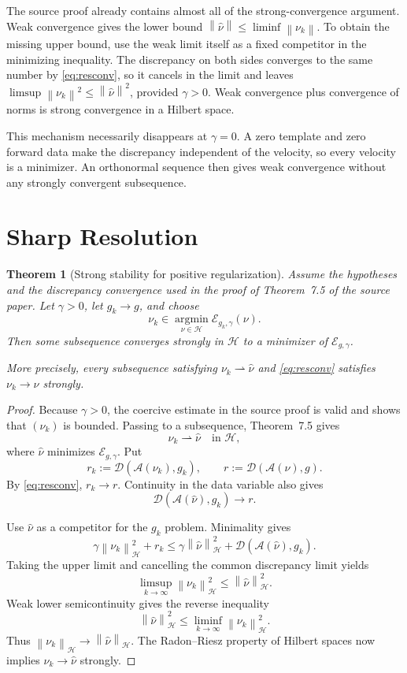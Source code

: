 \documentclass[11pt]{article}
\newtheorem{theorem}{Theorem}
\newcommand{\Hspace}{\mathcal H}
\newcommand{\Amap}{\mathcal A}
\newcommand{\Ddisc}{\mathcal D}
\newcommand{\Jfun}{\mathcal E}
\newcommand{\norm}[1]{\left\lVert#1\right\rVert}
\begin{document}
The source proof already contains almost all of the strong-convergence
argument.  Weak convergence gives the lower bound
$\norm{\widehat\nu}\leq\liminf\norm{\nu_k}$.  To obtain the missing upper
bound, use the weak limit itself as a fixed competitor in the minimizing
inequality.  The discrepancy on both sides converges to the same number by
\eqref{eq:resconv}, so it cancels in the limit and leaves
\(\limsup\norm{\nu_k}^2\leq\norm{\widehat\nu}^2\), provided $\gamma>0$.
Weak convergence plus convergence of norms is strong convergence in a Hilbert
space.

This mechanism necessarily disappears at $\gamma=0$.  A zero template and
zero forward data make the discrepancy independent of the velocity, so every
velocity is a minimizer.  An orthonormal sequence then gives weak convergence
without any strongly convergent subsequence.

\section*{Sharp Resolution}

\begin{theorem}[Strong stability for positive regularization]\label{thm:positive}
Assume the hypotheses and the discrepancy convergence used in the proof of
Theorem~7.5 of the source paper.  Let $\gamma>0$, let $g_k\to g$, and choose
\[
                  \nu_k\in\operatorname*{argmin}_{\nu\in\Hspace}
                  \Jfun_{g_k,\gamma}(\nu).
\]
Then some subsequence converges strongly in $\Hspace$ to a minimizer of
$\Jfun_{g,\gamma}$.

More precisely, every subsequence satisfying
$\nu_k\rightharpoonup\widehat\nu$ and \eqref{eq:resconv} satisfies
$\nu_k\to\widehat\nu$ strongly.
\end{theorem}

\begin{proof}
Because $\gamma>0$, the coercive estimate in the source proof is valid and
shows that $(\nu_k)$ is bounded.  Passing to a subsequence, Theorem~7.5 gives
\[
                  \nu_k\rightharpoonup\widehat\nu
                  \quad\text{in }\Hspace,
\]
where $\widehat\nu$ minimizes $\Jfun_{g,\gamma}$.  Put
\[
 r_k:=\Ddisc(\Amap(\nu_k),g_k),
 \qquad r:=\Ddisc(\Amap(\widehat\nu),g).
\]
By \eqref{eq:resconv}, $r_k\to r$.  Continuity in the data variable also gives
\[
 \Ddisc(\Amap(\widehat\nu),g_k)\longrightarrow r.
\]

Use $\widehat\nu$ as a competitor for the $g_k$ problem.  Minimality gives
\[
 \gamma\norm{\nu_k}_{\Hspace}^{2}+r_k
 \leq
 \gamma\norm{\widehat\nu}_{\Hspace}^{2}
 +\Ddisc(\Amap(\widehat\nu),g_k).
\]
Taking the upper limit and cancelling the common discrepancy limit yields
\[
 \limsup_{k\to\infty}\norm{\nu_k}_{\Hspace}^{2}
 \leq\norm{\widehat\nu}_{\Hspace}^{2}.
\]
Weak lower semicontinuity gives the reverse inequality
\[
 \norm{\widehat\nu}_{\Hspace}^{2}
 \leq\liminf_{k\to\infty}\norm{\nu_k}_{\Hspace}^{2}.
\]
Thus $\norm{\nu_k}_{\Hspace}\to\norm{\widehat\nu}_{\Hspace}$.  The Radon--Riesz
property of Hilbert spaces now implies
$\nu_k\to\widehat\nu$ strongly.
\end{proof}
\end{document}
